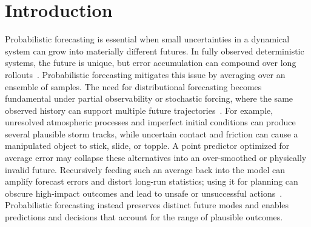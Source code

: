 \documentclass{article} %
\numberwithin{equation}{section}
\newcommand{\hans}[1]{\textcolor{blue}{hans: #1}}
\begin{document}
\section{Introduction}


Probabilistic forecasting is essential when small uncertainties in a dynamical system can grow into materially different futures. In fully observed deterministic systems, the future is unique, but error accumulation can compound over long rollouts~\citep{zhang2025zero}. Probabilistic forecasting mitigates this issue by averaging over an ensemble of samples. The need for distributional forecasting becomes fundamental under partial observability or stochastic forcing, where the same observed history can support multiple future trajectories~\citep{pfister2026stocbench}. For example, unresolved atmospheric processes and imperfect initial conditions can produce several plausible storm tracks, while uncertain contact and friction can cause a manipulated object to stick, slide, or topple. A point predictor optimized for average error may collapse these alternatives into an over-smoothed or physically invalid future. Recursively feeding such an average back into the model can amplify forecast errors and distort long-run statistics; using it for planning can obscure high-impact outcomes and lead to unsafe or unsuccessful actions~\citep{chua2018deep,porcher2026flow}. Probabilistic forecasting instead preserves distinct future modes and enables predictions and decisions that account for the range of plausible outcomes.
\end{document}
